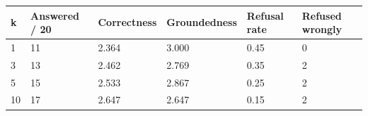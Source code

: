 \begin{tabular}{llllll}
\hline
k & Answered / 20 & Correctness & Groundedness & Refusal rate & Refused wrongly \\
\hline
1 & 11 & 2.364 & 3.000 & 0.45 & 0 \\
3 & 13 & 2.462 & 2.769 & 0.35 & 2 \\
5 & 15 & 2.533 & 2.867 & 0.25 & 2 \\
10 & 17 & 2.647 & 2.647 & 0.15 & 2 \\
\hline
\end{tabular}
